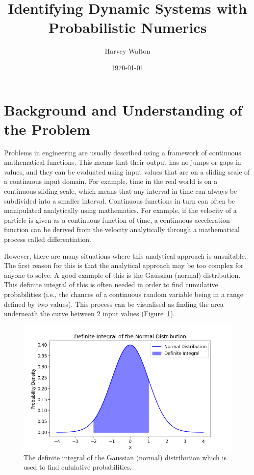 \documentclass[12pt]{article}
\title{Identifying Dynamic Systems with Probabilistic Numerics}
\author{Harvey Walton}
\date{\today}
\begin{document}

    \thispagestyle{empty}
    


    \tableofcontents
    \newpage


    \section{Background and Understanding of the Problem}


    Problems in engineering are usually described using a framework of continuous mathematical functions.
    This means that their output has no jumps or gaps in values, and they can be evaluated using input values that are on a sliding scale of a continuous input domain.
    For example, time in the real world is on a continuous sliding scale, which means that any interval in time can always be subdivided into a smaller interval.
    Continuous functions in turn can often be manipulated analytically using mathematics.
    For example, if the velocity of a particle is given as a continuous function of time, a continuous acceleration function can be derived from the velocity analytically through a mathematical process called differentiation.

    However, there are many situations where this analytical approach is unsuitable.
    The first reason for this is that the analytical approach may be too complex for anyone to solve.
    A good example of this is the Gaussian (normal) distribution.
    This definite integral of this is often needed in order to find cumulative probabilities (i.e., the chances of a continuous random variable being in a range defined by two values).
    This process can be visualised as finding the area underneath the curve between 2 input values (Figure~\ref{fig:ndi_}).

    \begin{figure}[H]
        \centering
        \includegraphics[width=0.8\linewidth]{figures/ndi/ndi_}
        \caption{The definite integral of the Gaussian (normal) distribution which is used to find cululative probabilities.}
        \label{fig:ndi_}
    \end{figure}
\end{document}
